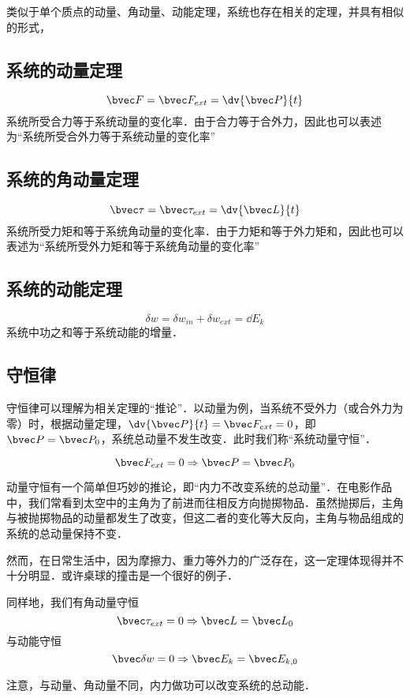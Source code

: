 类似于单个质点的动量、角动量、动能定理，系统也存在相关的定理，并具有相似的形式，

\subsection{系统的动量定理}
\begin{equation}
\bvec F = \bvec F_{ext} = \dv{\bvec P}{t}
\end{equation}
系统所受合力等于系统动量的变化率．由于合力等于合外力，因此也可以表述为“系统所受合外力等于系统动量的变化率”

\subsection{系统的角动量定理}
\begin{equation}
\bvec \tau = \bvec \tau_{ext} = \dv{\bvec L}{t}
\end{equation}
系统所受力矩和等于系统角动量的变化率．由于力矩和等于外力矩和，因此也可以表述为“系统所受外力矩和等于系统角动量的变化率”

\subsection{系统的动能定理}
\begin{equation}
\delta w =\delta w_{in} + \delta w_{ext} = \dd E_k
\end{equation}
系统中功之和等于系统动能的增量．

\subsection{守恒律}
守恒律可以理解为相关定理的“推论”．以动量为例，当系统不受外力（或合外力为零）时，根据动量定理，$\dv{\bvec P}{t} = \bvec F_{ext}=0$，即$\bvec P = \bvec P_0$，系统总动量不发生改变．此时我们称“系统动量守恒”．

\begin{equation}
\bvec F_{ext} = 0 \Rightarrow \bvec P = \bvec P_0
\end{equation}

动量守恒有一个简单但巧妙的推论，即“内力不改变系统的总动量”．在电影作品中，我们常看到太空中的主角为了前进而往相反方向抛掷物品．虽然抛掷后，主角与被抛掷物品的动量都发生了改变，但这二者的变化等大反向，主角与物品组成的系统的总动量保持不变．

然而，在日常生活中，因为摩擦力、重力等外力的广泛存在，这一定理体现得并不十分明显．或许桌球的撞击是一个很好的例子．

同样地，我们有角动量守恒
\begin{equation}
\bvec \tau_{ext} = 0 \Rightarrow \bvec L = \bvec L_0
\end{equation}
与动能守恒
\begin{equation}
\bvec \delta w = 0 \Rightarrow \bvec E_k = \bvec E_{k,0}
\end{equation}

注意，与动量、角动量不同，内力做功可以改变系统的总动能．
